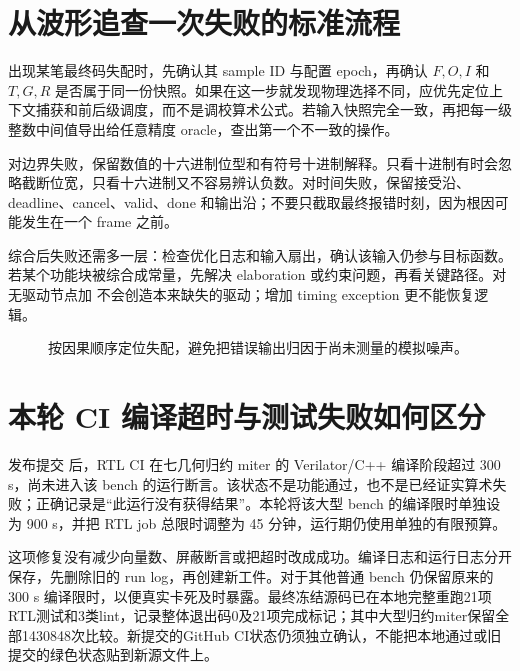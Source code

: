 \section{从波形追查一次失败的标准流程}
出现某笔最终码失配时，先确认其 sample ID 与配置 epoch，再确认 \(F,O,I\) 和 \(T,G,R\) 是否属于同一份快照。如果在这一步就发现物理选择不同，应优先定位上下文捕获和前后级调度，而不是调校算术公式。若输入快照完全一致，再把每一级整数中间值导出给任意精度 oracle，查出第一个不一致的操作。

对边界失败，保留数值的十六进制位型和有符号十进制解释。只看十进制有时会忽略截断位宽，只看十六进制又不容易辨认负数。对时间失败，保留接受沿、deadline、cancel、valid、done 和输出沿；不要只截取最终报错时刻，因为根因可能发生在一个 frame 之前。

综合后失败还需多一层：检查优化日志和输入扇出，确认该输入仍参与目标函数。若某个功能块被综合成常量，先解决 elaboration 或约束问题，再看关键路径。对无驱动节点加  不会创造本来缺失的驱动；增加 timing exception 更不能恢复逻辑。

\begin{figure}[htbp]\centering
{}
\caption{按因果顺序定位失配，避免把错误输出归因于尚未测量的模拟噪声。}
\end{figure}

\section{本轮 CI 编译超时与测试失败如何区分}
发布提交  后，RTL CI 在七几何归约 miter 的 Verilator/C++ 编译阶段超过 300 s，尚未进入该 bench 的运行断言。该状态不是功能通过，也不是已经证实算术失败；正确记录是“此运行没有获得结果”。本轮将该大型 bench 的编译限时单独设为 900 s，并把 RTL job 总限时调整为 45 分钟，运行期仍使用单独的有限预算。

这项修复没有减少向量数、屏蔽断言或把超时改成成功。编译日志和运行日志分开保存，先删除旧的 run log，再创建新工件。对于其他普通 bench 仍保留原来的 300 s 编译限时，以便真实卡死及时暴露。最终冻结源码已在本地完整重跑21项RTL测试和3类lint，记录整体退出码0及21项完成标记；其中大型归约miter保留全部1430848次比较。新提交的GitHub CI状态仍须独立确认，不能把本地通过或旧提交的绿色状态贴到新源文件上。


